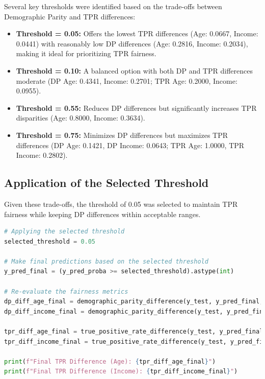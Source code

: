 \documentclass[12pt,a4paper]{report}
\begin{document}
Several key thresholds were identified based on the trade-offs between Demographic Parity and TPR differences:

\begin{itemize}
    \item \textbf{Threshold = 0.05:} Offers the lowest TPR differences (Age: 0.0667, Income: 0.0441) with reasonably low DP differences (Age: 0.2816, Income: 0.2034), making it ideal for prioritizing TPR fairness.
    \item \textbf{Threshold = 0.10:} A balanced option with both DP and TPR differences moderate (DP Age: 0.4341, Income: 0.2701; TPR Age: 0.2000, Income: 0.0955).
    \item \textbf{Threshold = 0.55:} Reduces DP differences but significantly increases TPR disparities (Age: 0.8000, Income: 0.3634).
    \item \textbf{Threshold = 0.75:} Minimizes DP differences but maximizes TPR differences (DP Age: 0.1421, DP Income: 0.0643; TPR Age: 1.0000, TPR Income: 0.2802).
\end{itemize}

\subsection{Application of the Selected Threshold}

Given these trade-offs, the threshold of 0.05 was selected to maintain TPR fairness while keeping DP differences within acceptable ranges.\\

\begin{lstlisting}[language=Python, caption={Applying the Selected Threshold}]
# Applying the selected threshold 
selected_threshold = 0.05  

# Make final predictions based on the selected threshold
y_pred_final = (y_pred_proba >= selected_threshold).astype(int)

# Re-evaluate the fairness metrics
dp_diff_age_final = demographic_parity_difference(y_test, y_pred_final, sensitive_features=X_test['customer_age'])
dp_diff_income_final = demographic_parity_difference(y_test, y_pred_final, sensitive_features=X_test['income'])

tpr_diff_age_final = true_positive_rate_difference(y_test, y_pred_final, sensitive_features=X_test['customer_age'])
tpr_diff_income_final = true_positive_rate_difference(y_test, y_pred_final, sensitive_features=X_test['income'])

print(f"Final TPR Difference (Age): {tpr_diff_age_final}")
print(f"Final TPR Difference (Income): {tpr_diff_income_final}")
\end{lstlisting}
\end{document}
